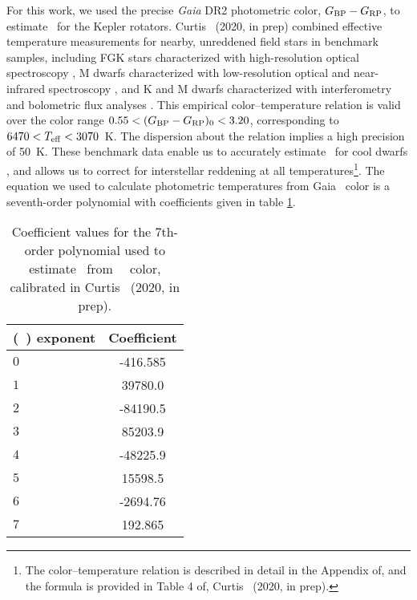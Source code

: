 For this work, we used the precise \textit{Gaia} DR2 photometric color,
$G_{\rm BP} - G_{\rm RP}$, to estimate \teff\ for the Kepler rotators.
Curtis \etal\ (2020, in prep) combined effective temperature measurements for
nearby, unreddened field stars in benchmark samples, including FGK stars
characterized with high-resolution optical spectroscopy \citep{brewer2016}, M
dwarfs characterized with low-resolution optical and near-infrared
spectroscopy \citep{mann2015}, and K and M dwarfs characterized with
interferometry and bolometric flux analyses \citep{boyajian2012}.
This empirical color--temperature relation is valid over the color range $0.55
< (G_{\rm BP} - G_{\rm RP})_0 < 3.20$, corresponding to $6470 < T_{\rm eff} <
3070$~K.
The dispersion about the relation implies a high precision of 50~K.
These benchmark data enable us to accurately estimate \teff\ for cool dwarfs
\citep[\eg][]{rabus2019}, and allows us to correct for interstellar reddening
at all temperatures\footnote{The color--temperature relation is described in
detail in the Appendix of, and the formula is provided in Table 4 of, Curtis
\etal\ (2020, in prep).}.
The equation we used to calculate photometric temperatures from Gaia \gcolor\
color is a seventh-order polynomial with coefficients given in table
\ref{tab:coeffs}.
\begin{table}[h!]
  \begin{center}
      \caption{
          Coefficient values for the 7th-order polynomial used to estimate
      \teff\ from \Gaia\ \gcolor\ color, calibrated in Curtis \etal\ (2020, in
      prep).}
    \label{tab:coeffs}
    \begin{tabular}{l|c} %
        (\gcolor\ ) exponent & Coefficient  \\
      \hline
      $0$ & -416.585 \\
      $1$ & 39780.0  \\
      $2$ & -84190.5 \\
      $3$ & 85203.9  \\
      $4$ & -48225.9 \\
      $5$ & 15598.5  \\
      $6$ & -2694.76 \\
      $7$ & 192.865  \\
    \end{tabular}
  \end{center}
\end{table}

